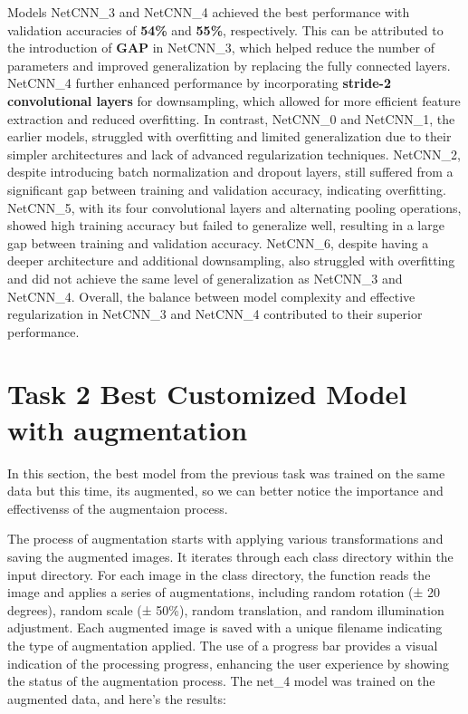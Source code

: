 \documentclass[12pt]{article}
\begin{document}
Models NetCNN\_3 and NetCNN\_4 achieved the best performance with validation accuracies of \textbf{54\%} and \textbf{55\%}, respectively. This can be attributed to the introduction of \textbf{GAP} in NetCNN\_3, which helped reduce the number of parameters and improved generalization by replacing the fully connected layers. NetCNN\_4 further enhanced performance by incorporating \textbf{stride-2 convolutional layers} for downsampling, which allowed for more efficient feature extraction and reduced overfitting. In contrast, NetCNN\_0 and NetCNN\_1, the earlier models, struggled with overfitting and limited generalization due to their simpler architectures and lack of advanced regularization techniques. NetCNN\_2, despite introducing batch normalization and dropout layers, still suffered from a significant gap between training and validation accuracy, indicating overfitting. NetCNN\_5, with its four convolutional layers and alternating pooling operations, showed high training accuracy but failed to generalize well, resulting in a large gap between training and validation accuracy. NetCNN\_6, despite having a deeper architecture  and additional downsampling, also struggled with overfitting and did not achieve the same level of generalization as NetCNN\_3 and NetCNN\_4. Overall, the balance between model complexity and effective regularization in NetCNN\_3 and NetCNN\_4 contributed to their superior performance.




\section*{Task 2 Best Customized Model with augmentation}
In this section, the best model from the previous task was trained on the same data but this time, its augmented, so we can better notice the importance and effectivenss of the augmentaion process. 

The process of augmentation starts with applying various transformations and saving the augmented images. It iterates through each class directory within the input directory. For each image in the class directory, the function reads the image and applies a series of augmentations, including random rotation (± 20 degrees), random scale (± 50\%), random translation, and random illumination adjustment. Each augmented image is saved with a unique filename indicating the type of augmentation applied. The use of a progress bar provides a visual indication of the processing progress, enhancing the user experience by showing the status of the augmentation process. The net\_4 model was trained on the augmented data, and here's the results:
\end{document}
